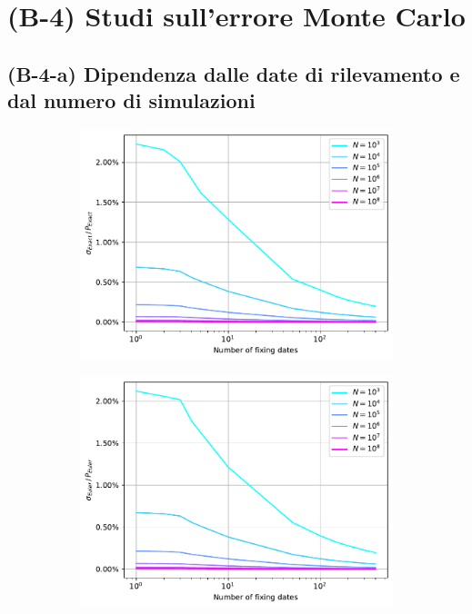 \lipsum[1-3]


\section{(B-4) Studi sull'errore Monte Carlo}
\subsection{(B-4-a) Dipendenza dalle date di rilevamento e dal numero di simulazioni}

\begin{figure}[t]
\centering
\begin{subfigure}{.5\textwidth}
  \centering
  \includegraphics[scale=0.5]{graphs/OptionPriceVsM_ExactErrorVsM_WithDifferentNs.pdf}
  \caption{}
  \label{fig:exact_error_M}
\end{subfigure}%
\begin{subfigure}{.5\textwidth}
  \centering
  \includegraphics[scale=0.5]{graphs/OptionPriceVsM_EulerErrorVsM_WithDifferentNs.pdf}

\end{subfigure}
\end{figure}
